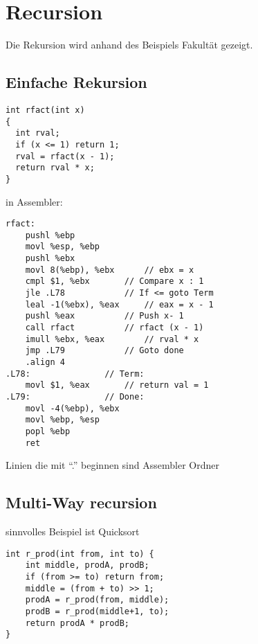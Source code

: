 \documentclass[a4paper, 11pt]{article}
\begin{document}
\newpage
\section{Recursion}
Die Rekursion wird anhand des Beispiels Fakultät gezeigt.\\
\subsection{Einfache Rekursion}
\begin{lstlisting}
int rfact(int x)
{
  int rval;
  if (x <= 1) return 1;
  rval = rfact(x - 1);
  return rval * x;
}
\end{lstlisting}
in Assembler:
\begin{lstlisting}
rfact:
    pushl %ebp
    movl %esp, %ebp
    pushl %ebx
    movl 8(%ebp), %ebx 		// ebx = x
    cmpl $1, %ebx		// Compare x : 1
    jle .L78			// If <= goto Term
    leal -1(%ebx), %eax		// eax = x - 1
    pushl %eax			// Push x- 1
    call rfact			// rfact (x - 1)
    imull %ebx, %eax		// rval * x
    jmp .L79			// Goto done
    .align 4
.L78: 				// Term:
    movl $1, %eax		// return val = 1
.L79:				// Done:
    movl -4(%ebp), %ebx
    movl %ebp, %esp
    popl %ebp
    ret
\end{lstlisting}
Linien die mit ``.'' beginnen sind Assembler Ordner
\subsection{Multi-Way recursion}
sinnvolles Beispiel ist Quicksort
\begin{lstlisting}
int r_prod(int from, int to) {
	int middle, prodA, prodB;
	if (from >= to) return from;
	middle = (from + to) >> 1;
	prodA = r_prod(from, middle);
	prodB = r_prod(middle+1, to);
	return prodA * prodB;
}
\end{lstlisting}
\end{document}
